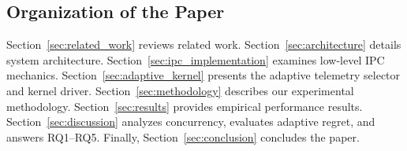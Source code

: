 \subsection{Organization of the Paper}
Section~\ref{sec:related_work} reviews related work. Section~\ref{sec:architecture} details system architecture. Section~\ref{sec:ipc_implementation} examines low-level IPC mechanics. Section~\ref{sec:adaptive_kernel} presents the adaptive telemetry selector and kernel driver. Section~\ref{sec:methodology} describes our experimental methodology. Section~\ref{sec:results} provides empirical performance results. Section~\ref{sec:discussion} analyzes concurrency, evaluates adaptive regret, and answers RQ1--RQ5. Finally, Section~\ref{sec:conclusion} concludes the paper.
